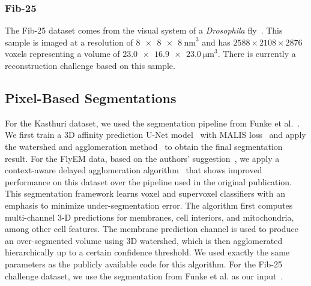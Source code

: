 \subsubsection{Fib-25}
The Fib-25 dataset comes from the visual system of a \textit{Drosophila} fly~\cite{takemura2015synaptic}. This sample is imaged at a resolution of $\SI[product-units=single]{8 x 8 x 8}{\nano\meter}^3$ and has $2588 \times 2108 \times 2876$ voxels representing a volume of $\SI[product-units=single]{23.0 x 16.9 x 23.0}{\micro\meter}^3$. 
There is currently a reconstruction challenge based on this sample.

\subsection{Pixel-Based Segmentations}
\label{sec:neuroproof}

For the Kasthuri dataset, we used the segmentation pipeline from Funke et al.~\cite{funke2017deep}. 
We first train a 3D affinity prediction U-Net model~\cite{ronneberger2015u} with MALIS loss~\cite{Turaga:2009} and apply the watershed and agglomeration method~\cite{funke2017deep} to obtain the final segmentation result.
For the FlyEM data, based on the authors' suggestion~\cite{takemura2017connectome}, we apply a context-aware delayed agglomeration algorithm~\cite{10.1371/journal.pone.0125825} that shows improved performance on this dataset over the pipeline used in the original publication. 
This segmentation framework learns voxel and supervoxel classifiers with an emphasis to minimize under-segmentation error. 
The algorithm first computes multi-channel 3-D predictions for membranes, cell interiors, and mitochondria, among other cell features. 
The membrane prediction channel is used to produce an over-segmented volume using 3D watershed, which is then agglomerated hierarchically up to a certain confidence threshold. 
We used exactly the same parameters as the publicly available code for this algorithm.
For the Fib-25 challenge dataset, we use the segmentation from Funke et al. as our input~\cite{funke2017deep}.

